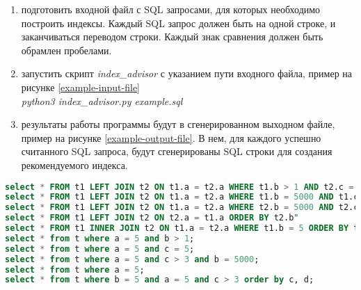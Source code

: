 \begin{enumerate}
\item подготовить входной файл с SQL запросами, для которых необходимо построить индексы. Каждый SQL запрос должен быть на одной строке, и заканчиваться переводом строки. Каждый знак сравнения должен быть обрамлен пробелами. 

\item запустить скрипт \textit{index_advisor} с указанием пути входного файла, пример на рисунке \ref{example-input-file}\\ \textit{python3 index_advisor.py example.sql}

\item результаты работы программы будут в сгенерированном выходном файле, пример на рисунке \ref{example-output-file}. В нем, для каждого успешно считанного SQL запроса, будут сгенерированы SQL строки для создания рекомендуемого индекса.
\end{enumerate}


\begin{lstlisting}[language=sql, caption={Пример входного файла},label=example-input-file]
select * FROM t1 LEFT JOIN t2 ON t1.a = t2.a WHERE t1.b > 1 AND t2.c = 5;
select * FROM t1 LEFT JOIN t2 ON t1.a = t2.a WHERE t1.b = 5000 AND t1.c > 3 ORDER BY t2.c , t2.d;
select * FROM t1 LEFT JOIN t2 ON t1.a = t2.a WHERE t2.b = 5000 AND t2.c > 3 ORDER BY t2.c, t2.d;
select * FROM t1 LEFT JOIN t2 ON t2.a = t1.a ORDER BY t2.b"
select * FROM t1 INNER JOIN t2 ON t1.a = t2.a WHERE t1.b = 5 ORDER BY t1.c;
select * from t where a = 5 and b > 1;
select * from t where a = 5 and c = 5;
select * from t where a = 5 and c > 3 and b = 5000;
select * from t where a = 5;
select * from t where b = 5 and a = 5 and c > 3 order by c, d;
\end{lstlisting}

